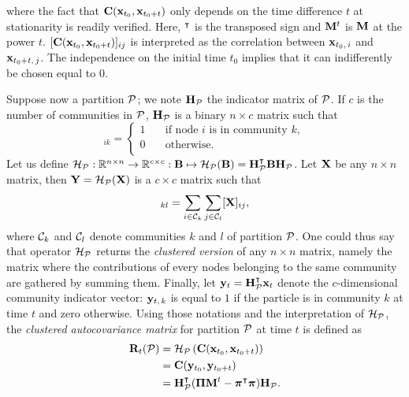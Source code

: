 where the fact that $\b C(\b x_{t_0},\b x_{t_0+t})$ only depends on the time difference $t$ at stationarity is readily verified. Here, $^\t$ is the transposed sign and $\b M^t$ is $\b M$ at the power $t$. $[\b C(\b x_{t_0},\b x_{t_0+t})]_{ij}$ is interpreted as the correlation between $\b x_{t_0,\,i}$ and $\b x_{t_0+t,\,j}$. The independence on the initial time $t_0$ implies that it can indifferently be chosen equal to $0$.

Suppose now a partition $\P$; we note $\b H_{\P}$ the indicator matrix of $\P$. If $c$ is the number of communities in $\P$, $\b H_{\P}$ is a binary $n \times c$ matrix such that 
\begin{equation}
	[\b H_{\P}]_{ik} = 
	\begin{cases}
		1  & \quad \mbox{if node $i$ is in community $k$},\\
	    0  & \quad \text{otherwise}.\\
	\end{cases}
\end{equation}
Let us define $\mathcal{H}_{\P} : \R[n \times n] \rightarrow \R[c \times c] : \b B \mapsto \mathcal{H}_\P(\b B) = \b H_{\P}^{\t} \b B \b H_{\P}$. Let $\b X$ be any $n \times n$ matrix, then $\b Y = \mathcal{H}_{\P}(\b X)$ is a $c \times c$ matrix such that 
\begin{equation}
	[\b Y]_{kl} = \sum_{i \in \C_k} \sum_{j \in \C_l} [\b X]_{ij},	
\end{equation}
where $\C_k$ and $\C_l$ denote communities $k$ and $l$ of partition $\P$. One could thus say that operator $\mathcal{H}_{\P}$ returns the \textit{clustered version} of any $n \times n$ matrix, namely the matrix where the contributions of every nodes belonging to the same community are gathered by summing them. Finally, let $\b y_t = \b H_{\P}^{\t} \b x_t$ denote the $c$-dimensional community indicator vector: $\b y_{t,\,k}$ is equal to $1$ if the particle is in community $k$ at time $t$ and zero otherwise.
Using those notations and the interpretation of $\mathcal{H}_{\P} $, the \textit{clustered autocovariance matrix} for partition $\P$ at time $t$ is defined as
\begin{subequations}
	\begin{align}
		\b R_t(\P) &= \mathcal{H}_{\P}\left(\b C(\b x_{t_0},\b x_{t_0+t})\right)\\
			&= \b C(\b y_{t_0},\b y_{t_0+t})\\
			&= \b H_{\P}^{\t}(\b \Pi\b M^t - \bs \pi^{\t}\bs \pi)\b H_{\P}.
	\end{align}
\end{subequations}
